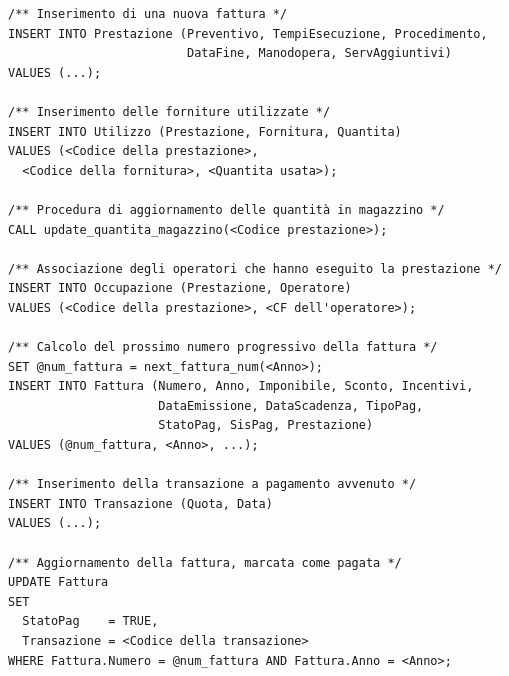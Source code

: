         \begin{lstlisting}
/** Inserimento di una nuova fattura */
INSERT INTO Prestazione (Preventivo, TempiEsecuzione, Procedimento,
                         DataFine, Manodopera, ServAggiuntivi)
VALUES (...);

/** Inserimento delle forniture utilizzate */
INSERT INTO Utilizzo (Prestazione, Fornitura, Quantita)
VALUES (<Codice della prestazione>, 
  <Codice della fornitura>, <Quantita usata>);

/** Procedura di aggiornamento delle quantità in magazzino */
CALL update_quantita_magazzino(<Codice prestazione>);

/** Associazione degli operatori che hanno eseguito la prestazione */
INSERT INTO Occupazione (Prestazione, Operatore)
VALUES (<Codice della prestazione>, <CF dell'operatore>);

/** Calcolo del prossimo numero progressivo della fattura */
SET @num_fattura = next_fattura_num(<Anno>);
INSERT INTO Fattura (Numero, Anno, Imponibile, Sconto, Incentivi,
                     DataEmissione, DataScadenza, TipoPag,
                     StatoPag, SisPag, Prestazione)
VALUES (@num_fattura, <Anno>, ...);

/** Inserimento della transazione a pagamento avvenuto */
INSERT INTO Transazione (Quota, Data)
VALUES (...);

/** Aggiornamento della fattura, marcata come pagata */
UPDATE Fattura
SET
  StatoPag    = TRUE,
  Transazione = <Codice della transazione>
WHERE Fattura.Numero = @num_fattura AND Fattura.Anno = <Anno>;
        \end{lstlisting}

